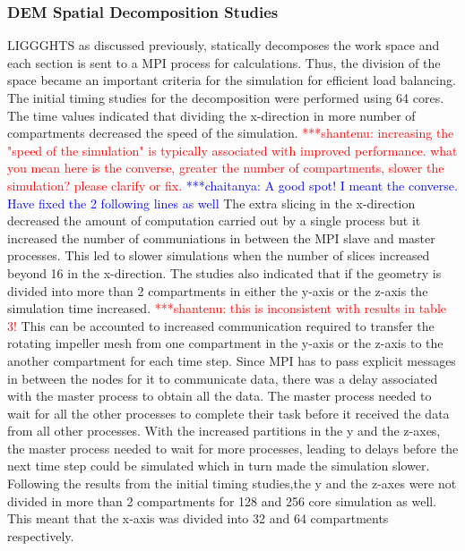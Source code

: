 \documentclass[preprint,11pt,authoryear]{elsarticle}
\newcommand{\jhanote}[1]{ {\textcolor{red} { ***shantenu: #1 }}}
\newcommand{\csnote}[1]{ {\textcolor{blue} { ***chaitanya: #1 }}}
\newcommand{\gpnote}[1]{{\textcolor{green} {***giannis: #1}}}
\newcommand{\jhanote}[1]{}
\newcommand{\csnote}[1]{}
\newcommand{\gpnote}[1]{}
\begin{document}
\subsubsection{DEM Spatial Decomposition Studies}
LIGGGHTS as discussed previously, statically decomposes the work space and
each section is sent to a MPI process for calculations. Thus, the division of
the space became an important criteria for the simulation for efficient load
balancing. The initial timing studies for the decomposition were performed using 64
cores. The time values indicated that dividing the
x-direction in more number of compartments decreased the speed of the simulation. 
\jhanote{increasing the "speed of the simulation" is typically
associated with improved performance. what you mean here is the converse,
greater the number of compartments, slower the simulation? please clarify or
fix.} \csnote{A good spot! I meant the converse. Have fixed the 2 following lines as well} 
The extra slicing in the x-direction decreased the amount of computation carried out by 
a single process but it increased the number of communiations in between the MPI slave 
and master processes. This led to slower simulations when the number of slices 
increased beyond 16 in the x-direction. 
The studies also indicated that if the geometry is divided into more than 2 compartments 
in either the y-axis or the z-axis the simulation time increased. 
\jhanote{this is inconsistent with results in table 3!} 
This can be accounted to increased communication required to transfer 
the rotating impeller mesh from one compartment in the y-axis or the z-axis 
to the another compartment for each time step. Since MPI has to pass explicit 
messages in between the nodes for it to communicate data, there was a delay 
associated with the master process to obtain all the data. The master process
needed to wait for all the other processes to complete their task before it received 
the data from all other processes. With the increased 
partitions in the y and the z-axes, the master process needed to wait for more 
processes, leading to delays before the next time step could be simulated which 
in turn made the simulation slower.
Following the results from the initial timing studies,the y and the z-axes were not divided
in more than 2 compartments for 128 and 256 core simulation as well. This
meant that the x-axis was divided into 32 and 64 compartments respectively. 
\end{document}
